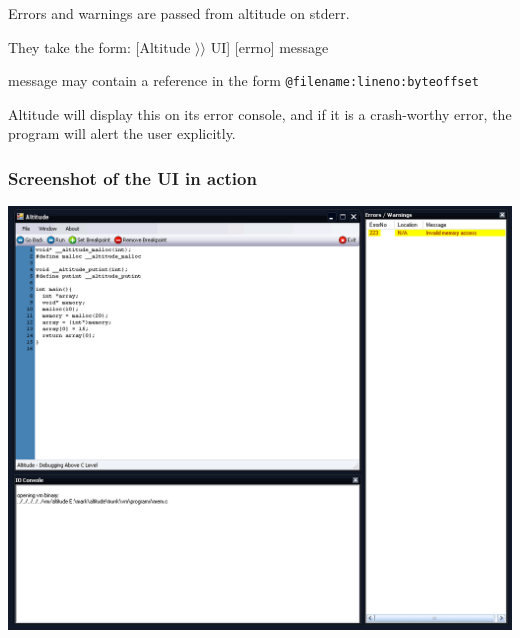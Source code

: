 \documentclass[10pt,a4paper]{report}
\begin{document}
Errors and warnings are passed from altitude on stderr.

They take the form:
[Altitude $\rangle\rangle$ UI] [errno] message

message may contain a reference in the form \lstinline{@filename:lineno:byteoffset}


Altitude will display this on its error console, and if it is a crash-worthy error, the program will alert the user explicitly.

\subsubsection{Screenshot of the UI in action}
\includegraphics[scale=0.35]{gui_screenshot.png}
\end{document}
